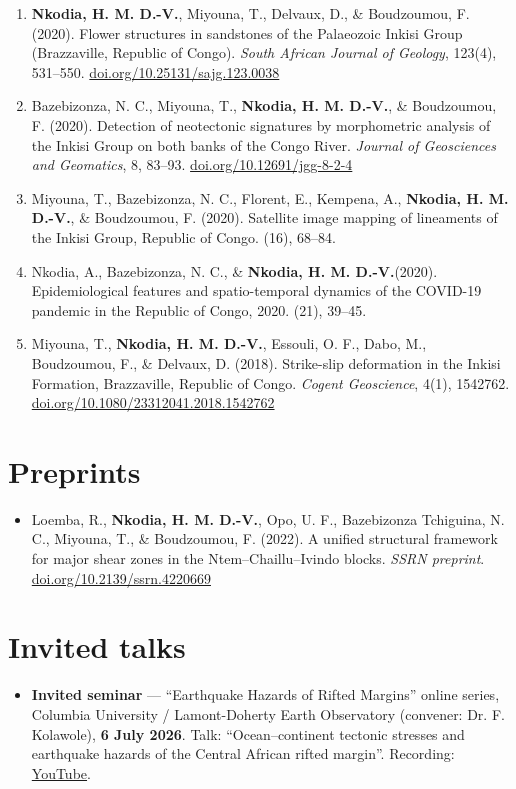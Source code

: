 \documentclass[11pt,a4paper]{article}
\newcommand{\hy}{\textbf{Nkodia, H. M. D.-V.}}
\newcommand{\doilink}[1]{\href{https://doi.org/#1}{doi.org/#1}}
\begin{document}
\begin{enumerate}
\item \hy, Miyouna, T., Delvaux, D., \& Boudzoumou, F. (2020). Flower structures in sandstones of the Palaeozoic Inkisi Group (Brazzaville, Republic of Congo). \textit{South African Journal of Geology}, 123(4), 531--550. \doilink{10.25131/sajg.123.0038}
\item Bazebizonza, N. C., Miyouna, T., \hy, \& Boudzoumou, F. (2020). Detection of neotectonic signatures by morphometric analysis of the Inkisi Group on both banks of the Congo River. \textit{Journal of Geosciences and Geomatics}, 8, 83--93. \doilink{10.12691/jgg-8-2-4}
\item Miyouna, T., Bazebizonza, N. C., Florent, E., Kempena, A., \hy, \& Boudzoumou, F. (2020). Satellite image mapping of lineaments of the Inkisi Group, Republic of Congo. (16), 68--84.
\item Nkodia, A., Bazebizonza, N. C., \& \hy (2020). Epidemiological features and spatio-temporal dynamics of the COVID-19 pandemic in the Republic of Congo, 2020. (21), 39--45.
\item Miyouna, T., \hy, Essouli, O. F., Dabo, M., Boudzoumou, F., \& Delvaux, D. (2018). Strike-slip deformation in the Inkisi Formation, Brazzaville, Republic of Congo. \textit{Cogent Geoscience}, 4(1), 1542762. \doilink{10.1080/23312041.2018.1542762}
\end{enumerate}

\section{Preprints}
\begin{itemize}
\item Loemba, R., \hy, Opo, U. F., Bazebizonza Tchiguina, N. C., Miyouna, T., \& Boudzoumou, F. (2022). A unified structural framework for major shear zones in the Ntem--Chaillu--Ivindo blocks. \textit{SSRN preprint}. \doilink{10.2139/ssrn.4220669}
\end{itemize}

\section{Invited talks}
\begin{itemize}
\item \textbf{Invited seminar} — ``Earthquake Hazards of Rifted Margins'' online series, Columbia University / Lamont-Doherty Earth Observatory (convener: Dr. F. Kolawole), \textbf{6 July 2026}. Talk: ``Ocean--continent tectonic stresses and earthquake hazards of the Central African rifted margin''. Recording: \href{https://www.youtube.com/watch?v=lnRf0Jz0QbM}{YouTube}.
\end{itemize}
\end{document}
